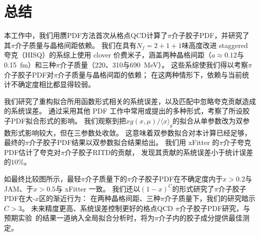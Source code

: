 \section{总结}\label{sec:summary}

本工作中，我们用赝PDF方法首次从格点QCD计算了$\pi$介子胶子PDF，并研究了其$\pi$介子质量与晶格间距依赖。
我们在具有$N_f = 2+1+1$味高度改进 staggered 夸克（HISQ）的系综上使用 clover 价费米子，涵盖两种晶格间距（$a\approx 0.12$与0.15~fm）和三种$\pi$介子质量（220、310与690~MeV）。
这些系综使我们得以考察$\pi$介子胶子PDF对$\pi$介子质量与晶格间距的依赖；
在这两种情形下，依赖与当前统计不确定度相比都显得较弱。

我们研究了重构拟合所用函数形式相关的系统误差，以及匹配中忽略夸克贡献造成的系统误差。
通过采用其他 PDF 工作中常用或提出的多种形式，考察了所设胶子PDF拟合形式的影响。
我们观察到把$xg(x, \mu)/\langle x \rangle_g$的拟合从单参数改为双参数形式影响较大，但在三参数处收敛。
这意味着双参数拟合对本计算已经足够，最终的$\pi$介子胶子PDF结果以双参数拟合结果给出。
我们用 xFitter 的$\pi$介子夸克PDF估计了夸克对$\pi$介子胶子RITD的贡献，
发现其贡献的系统误差小于统计误差的$10\%$。

如最终比较图所示，最轻$\pi$介子质量下的$\pi$介子胶子PDF在不确定度内于$x>0.2$与 JAM、于$x>0.5$与 xFitter 一致。
我们还以$(1-x)^C$的形式研究了$\pi$介子胶子PDF在大-$x$区的渐近行为：
在两种晶格间距、三种$\pi$介子质量下，我们的研究暗示$C>3$。
未来精度更高、系统误差控制更好的格点QCD $\pi$介子胶子PDF研究，与预期实验~\cite{Denisov:2018unj,Arrington:2021biu,Anderle:2021wcy,Denisov:2018unj}的结果一道纳入全局拟合分析时，将为$\pi$介子内的胶子成分提供最佳测定。

